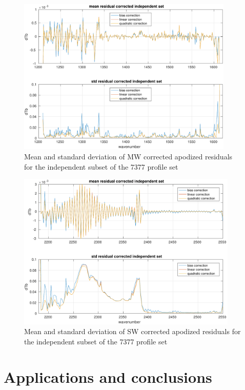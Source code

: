 \documentclass[11pt]{article}
\begin{document}
\begin{figure} %
  \centering
  \includegraphics[height=7.5cm]{figures/a2cris_stat_MW.pdf}
  \caption{Mean and standard deviation of MW corrected apodized
    residuals for the independent subset of the 7377 profile set}
  \label{statMW}
\end{figure}

\begin{figure} %
  \centering
  \includegraphics[height=7.5cm]{figures/a2cris_stat_SW.pdf}
  \caption{Mean and standard deviation of SW corrected apodized
    residuals for the independent subset of the 7377 profile set}
  \label{statSW}
\end{figure}

% 
% 
% 

\FloatBarrier
\section{Applications and conclusions}
\label{appcon}

\FloatBarrier


\end{document}
